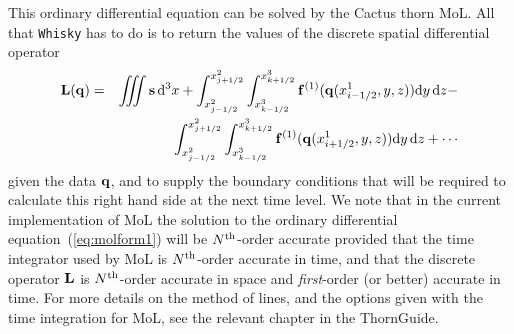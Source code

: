 \documentclass{article}
\begin{document}
This ordinary differential equation can be solved by the Cactus thorn
MoL. All that {\tt Whisky} has to do is to return the values of the discrete
spatial differential operator
\begin{eqnarray}
  \label{eq:molrhs1} \nonumber
  {\bf L}({\bf q}) & = & \int \!\!\!\! \int \!\!\!\!
      \int {\bf s} \,{\rm d}^3 x + \int_{x^2_{j-1/2}}^{x^2_{j+1/2}}
    \int_{x^3_{k-1/2}}^{x^3_{k+1/2}} {\bf f}^{(1)} ({\bf q}
    (x^1_{i-1/2}, y, z)) {\rm d} y \, {\rm d} z - \\
    &&    \int_{x^2_{j-1/2}}^{x^2_{j+1/2}} 
    \int_{x^3_{k-1/2}}^{x^3_{k+1/2}} {\bf f}^{(1)} ({\bf q}
    (x^1_{i+1/2}, y, z)) {\rm d} y \, {\rm d} z + \cdots
\end{eqnarray}
given the data ${\bf q}$, and to supply the boundary conditions that will
be required to calculate this right hand side at the next time level.
We note that in the current implementation of MoL the solution to the
ordinary differential equation~(\ref{eq:molform1}) will be $N^{\rm
  th}$-order accurate provided that the time integrator used by MoL is $N^{\rm
  th}$-order accurate in time, and that the discrete operator ${\bf L}$ is
$N^{\rm th}$-order accurate in space and {\it first}-order (or better)
accurate in time.  For more details on the method of lines, and the
options given with the time integration for MoL, see the relevant
chapter in the ThornGuide.
\end{document}
